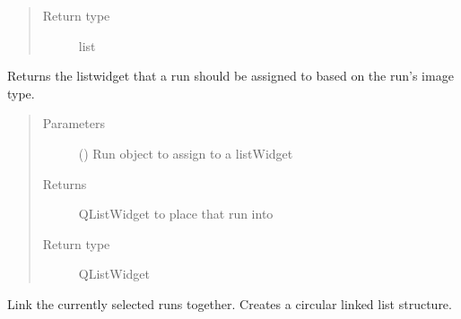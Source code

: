 \documentclass[letterpaper,10pt,english]{sphinxmanual}
\begin{document}
\begin{fulllineitems}
\begin{fulllineitems}
\begin{quote}
\begin{description}
\item[{Return type}] \leavevmode
list

\end{description}\end{quote}

\end{fulllineitems}


\begin{fulllineitems}
\label{\detokenize{polo.windows:polo.windows.spectrum_dialog.SpectrumDialog.get_spectrum_list}}
Returns the listwidget that a run should be assigned to based
on the run’s image type.
\begin{quote}\begin{description}
\item[{Parameters}] \leavevmode
{} ({\hyperref[\detokenize{polo.crystallography:polo.crystallography.run.Run}]{}}) \textendash{} Run object to assign to a listWidget

\item[{Returns}] \leavevmode
QListWidget to place that run into

\item[{Return type}] \leavevmode
QListWidget

\end{description}\end{quote}

\end{fulllineitems}


\begin{fulllineitems}
\label{\detokenize{polo.windows:polo.windows.spectrum_dialog.SpectrumDialog.link_current_selection}}
Link the currently selected runs together. Creates a circular
linked list structure.

\end{fulllineitems}


\end{fulllineitems}
\end{document}
